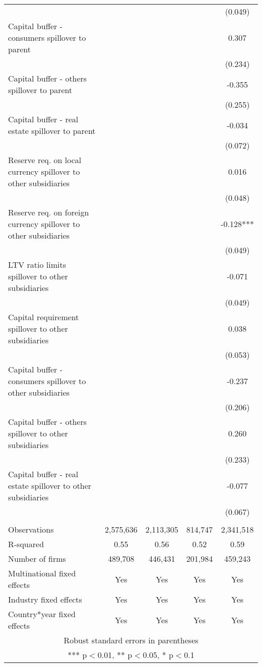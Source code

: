 \begin{tabular}{lcccc}
 &  &  &  & (0.049) \\
Capital buffer - consumers spillover to parent &  &  &  & 0.307 \\
 &  &  &  & (0.234) \\
Capital buffer - others spillover to parent &  &  &  & -0.355 \\
 &  &  &  & (0.255) \\
Capital buffer - real estate spillover to parent &  &  &  & -0.034 \\
 &  &  &  & (0.072) \\
Reserve req. on local currency spillover to other subsidiaries &  &  &  & 0.016 \\
 &  &  &  & (0.048) \\
Reserve req. on foreign currency spillover to other subsidiaries &  &  &  & -0.128*** \\
 &  &  &  & (0.049) \\
LTV ratio limits spillover to other subsidiaries &  &  &  & -0.071 \\
 &  &  &  & (0.049) \\
Capital requirement spillover to other subsidiaries &  &  &  & 0.038 \\
 &  &  &  & (0.053) \\
Capital buffer - consumers spillover to other subsidiaries &  &  &  & -0.237 \\
 &  &  &  & (0.206) \\
Capital buffer - others spillover to other subsidiaries &  &  &  & 0.260 \\
 &  &  &  & (0.233) \\
Capital buffer - real estate spillover to other subsidiaries &  &  &  & -0.077 \\
 &  &  &  & (0.067) \\
 &  &  &  &  \\
Observations & 2,575,636 & 2,113,305 & 814,747 & 2,341,518 \\
R-squared & 0.55 & 0.56 & 0.52 & 0.59 \\
Number of firms & 489,708 & 446,431 & 201,984 & 459,243 \\
Multinational fixed effects & Yes & Yes & Yes & Yes \\
Industry fixed effects & Yes & Yes & Yes & Yes \\
 Country*year fixed effects & Yes & Yes & Yes & Yes \\ \hline
\multicolumn{5}{c}{ Robust standard errors in parentheses} \\
\multicolumn{5}{c}{ *** p$<$0.01, ** p$<$0.05, * p$<$0.1} \\
\end{tabular}
